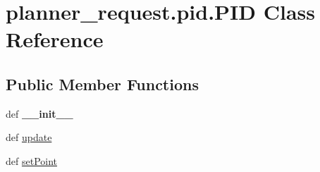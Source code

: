 \hypertarget{classplanner__request_1_1pid_1_1_p_i_d}{\section{planner\-\_\-request.\-pid.\-P\-I\-D \-Class \-Reference}
\label{classplanner__request_1_1pid_1_1_p_i_d}
}
\subsection*{\-Public \-Member \-Functions}
\begin{DoxyCompactItemize}
\item 
\hypertarget{classplanner__request_1_1pid_1_1_p_i_d_aa45874f02ce5b93771059aed55193968}{def {\bfseries \-\_\-\-\_\-init\-\_\-\-\_\-}}\label{classplanner__request_1_1pid_1_1_p_i_d_aa45874f02ce5b93771059aed55193968}

\item 
def \hyperlink{classplanner__request_1_1pid_1_1_p_i_d_a69bff2191aeaae9affc53db9ca5dfaa7}{update}
\item 
def \hyperlink{classplanner__request_1_1pid_1_1_p_i_d_ab9ca9fb951728a59c094e641c611e6ee}{set\-Point}
\end{DoxyCompactItemize}
